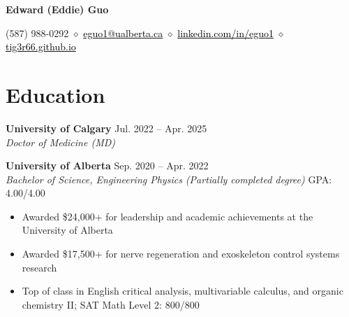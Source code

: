 \documentclass{article}
\begin{document}
\thispagestyle{plain}
\begin{center}
\LARGE \textbf{\textcolor{my_colour}{Edward (Eddie) Guo}} \vspace{.2em}

\normalfont \normalsize
(587) 988-0292
    \hspace{.15em} $\diamond$ \hspace{.15em}
\href{mailto:eguo1@ualberta.ca}{\textcolor{black}{eguo1@ualberta.ca}}
    \hspace{.15em} $\diamond$ \hspace{.15em}
\href{https://www.linkedin.com/in/eguo1}{\textcolor{black}{linkedin.com/in/eguo1}}
    \hspace{.15em} $\diamond$ \hspace{.15em}
\href{https://tig3r66.github.io/index.html}{\textcolor{black}{tig3r66.github.io}}
\end{center}

\vspace{-1em}


\section*{\textcolor{my_colour}{Education}}
\vspace{-.25em} \hrulefill \vspace{.25em}

\textbf{University of Calgary} \hfill Jul. 2022 -- Apr. 2025 \\
\textit{Doctor of Medicine (MD)} \vspace{1em}

\textbf{University of Alberta} \hfill Sep. 2020 -- Apr. 2022 \\
\textit{Bachelor of Science, Engineering Physics (Partially completed degree)} \hfill GPA: 4.00/4.00
\begin{itemize}
    \item Awarded \$24,000+ for leadership and academic achievements at the University of Alberta
    \item Awarded \$17,500+ for nerve regeneration and exoskeleton control systems research
    \item Top of class in English critical analysis, multivariable calculus, and organic chemistry II; SAT Math Level 2: 800/800
\end{itemize} \vspace{1em}
\end{document}
